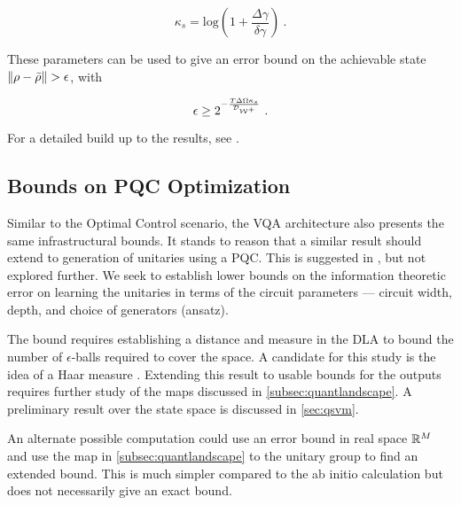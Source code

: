 \begin{equation}
    \kappa_s = \text{log}(1+\frac{\Delta\gamma}{\delta\gamma})~.
\end{equation}

These parameters can be used to give an error bound on the achievable state
\(\norm{\rho - \bar{\rho}} > \epsilon\), with

\begin{equation}
    \epsilon \geq 2^{-\frac{T\Delta\Omega\kappa_s}{\mathcal{D}_{\mathcal{W^+}}}}~.
\end{equation}

For a detailed build up to the results, see \cite{lloyd2014information}.

\subsection{Bounds on PQC Optimization}

Similar to the Optimal Control scenario, the VQA architecture also presents the
same infrastructural bounds. It stands to reason that a similar result should
extend to generation of unitaries using a PQC. This is suggested in
\cite{lloyd2014information}, but not explored further. We seek to establish
lower bounds on the information theoretic error on learning the unitaries in
terms of the circuit parameters --- circuit width, depth, and choice of
generators (ansatz).

The bound requires establishing a distance and measure in the DLA to bound the
number of \(\epsilon\)-balls required to cover the space. A candidate for this
study is the idea of a Haar measure \cite{van1995haar}. Extending this result to
usable bounds for the outputs requires further study of the maps discussed in
\autoref{subsec:quantlandscape}. A preliminary result over the state space is
discussed in \autoref{sec:qsvm}.

An alternate possible computation could use an error bound in real space
\(\mathbb{R}^M\) and use the map in \autoref{subsec:quantlandscape} to the unitary
group to find an extended bound. This is much simpler compared to the ab initio
calculation but does not necessarily give an exact bound.
